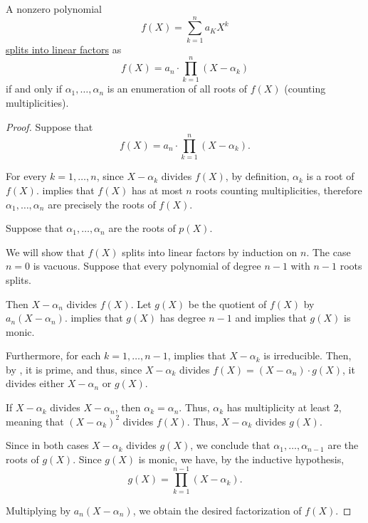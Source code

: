 \begin{proposition}\label{thm:polynomial_into_linear_factors}
  A nonzero polynomial
  \begin{equation*}
    f(X) = \sum_{k=1}^n a_K X^k
  \end{equation*}
  \hyperref[def:polynomial_splits_into_linear_factors]{splits into linear factors} as
  \begin{equation*}
    f(X) = a_n \cdot \prod_{k=1}^n (X - \alpha_k)
  \end{equation*}
  if and only if \( \alpha_1, \ldots, \alpha_n \) is an enumeration of all roots of \( f(X) \) (counting multiplicities).
\end{proposition}
\begin{proof}
  \SufficiencySubProof Suppose that
  \begin{equation*}
    f(X) = a_n \cdot \prod_{k=1}^n (X - \alpha_k).
  \end{equation*}

  For every \( k = 1, \ldots, n \), since \( X - \alpha_k \) divides \( f(X) \), by definition, \( \alpha_k \) is a root of \( f(X) \).  implies that \( f(X) \) has at most \( n \) roots counting multiplicities, therefore \( \alpha_1, \ldots, \alpha_n \) are precisely the roots of \( f(X) \).

  \NecessitySubProof Suppose that \( \alpha_1, \ldots, \alpha_n \) are the roots of \( p(X) \).

  We will show that \( f(X) \) splits into linear factors by induction on \( n \). The case \( n = 0 \) is vacuous. Suppose that every polynomial of degree \( n - 1 \) with \( n - 1 \) roots splits.

  Then \( X - \alpha_n \) divides \( f(X) \). Let \( g(X) \) be the quotient of \( f(X) \) by \( a_n (X - \alpha_n) \).  implies that \( g(X) \) has degree \( n - 1 \) and  implies that \( g(X) \) is monic.

  Furthermore, for each \( k = 1, \ldots, n - 1 \),  implies that \( X - \alpha_k \) is irreducible. Then, by , it is prime, and thus, since \( X - \alpha_k \) divides \( f(X) = (X - \alpha_n) \cdot g(X) \), it divides either \( X - \alpha_n \) or \( g(X) \).

  If \( X - \alpha_k \) divides \( X - \alpha_n \), then \( \alpha_k = \alpha_n \). Thus, \( \alpha_k \) has multiplicity at least \( 2 \), meaning that \( (X - \alpha_k)^2 \) divides \( f(X) \). Thus, \( X - \alpha_k \) divides \( g(X) \).

  Since in both cases \( X - \alpha_k \) divides \( g(X) \), we conclude that \( \alpha_1, \ldots, \alpha_{n-1} \) are the roots of \( g(X) \). Since \( g(X) \) is monic, we have, by the inductive hypothesis,
  \begin{equation*}
    g(X) = \prod_{k=1}^{n-1} (X - \alpha_k).
  \end{equation*}

  Multiplying by \( a_n (X - \alpha_n) \), we obtain the desired factorization of \( f(X) \).
\end{proof}

